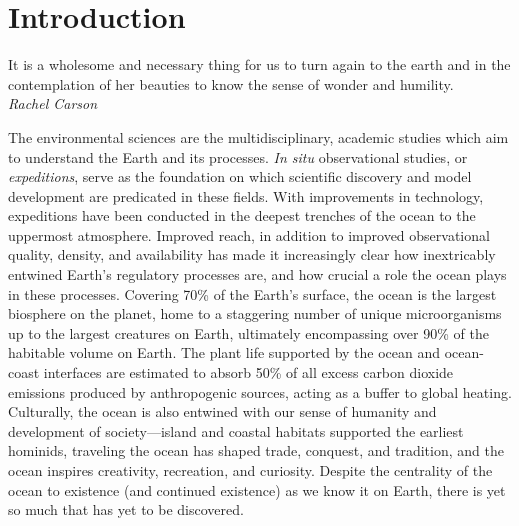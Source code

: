 \chapter{Introduction}
\label{chap:intro}

\begin{center}
    \begin{minipage}{0.7\textwidth}
      \begin{small}
       It is a wholesome and necessary thing for us to turn again to the earth and in the contemplation of her beauties to know the sense of wonder and humility.\\ \emph{Rachel Carson}
      \end{small}
    \end{minipage}
    \vspace{0.5cm}
\end{center}



The environmental sciences are the multidisciplinary, academic studies which aim to understand the Earth and its processes.
\emph{In situ} observational studies, or \emph{expeditions}, serve as the foundation on which scientific discovery and model development are predicated in these fields.
With improvements in technology, expeditions have been conducted in the deepest trenches of the ocean to the uppermost atmosphere.
Improved reach, in addition to improved observational quality, density, and availability has made it increasingly clear how inextricably entwined Earth's regulatory processes are, and how crucial a role the ocean plays in these processes.
Covering 70\% of the Earth's surface, the ocean is the largest biosphere on the planet, home to a staggering number of unique microorganisms up to the largest creatures on Earth, ultimately encompassing over 90\% of the habitable volume on Earth\autocite{cario2019exploring,purkis2022remote}.
The plant life supported by the ocean and ocean-coast interfaces are estimated to absorb 50\% of all excess carbon dioxide emissions produced by anthropogenic sources, acting as a buffer to global heating\autocite{hori2019blue}.
Culturally, the ocean is also entwined with our sense of humanity and development of society---island and coastal habitats supported the earliest hominids\autocite{erlandson2006oceans}, traveling the ocean has shaped trade, conquest, and tradition\autocite{pearson2003indian,chaudhuri1985trade,firth2019understanding,nunn2003nature}, and the ocean inspires creativity, recreation, and curiosity.
Despite the centrality of the ocean to existence (and continued existence) as we know it on Earth, there is yet so much that has yet to be discovered.

